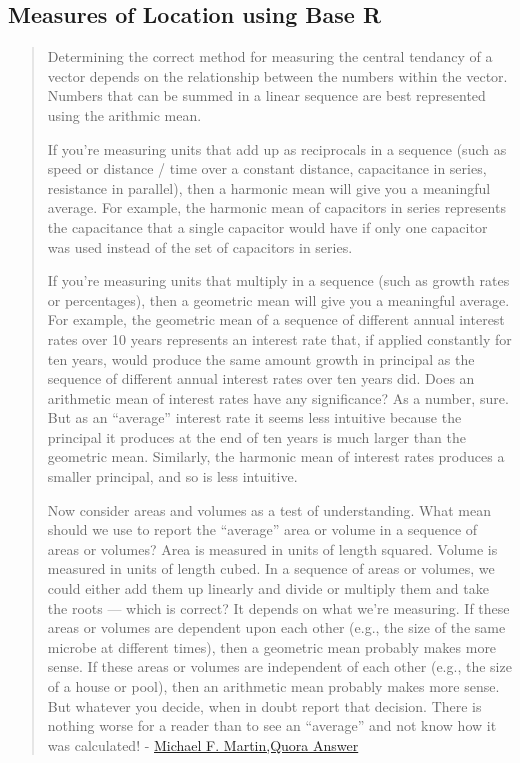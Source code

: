 \documentclass[12pt,]{article}
\theoremstyle{definition}
\theoremstyle{definition}
\theoremstyle{definition}
\theoremstyle{remark}
\begin{document}
\hypertarget{htmlwidget-2f1655e457bef4a9b862}{}

\subsection{Measures of Location using Base
R}\label{measures-of-location-using-base-r}

\begin{quote}
Determining the correct method for measuring the central tendancy of a
vector depends on the relationship between the numbers within the
vector. Numbers that can be summed in a linear sequence are best
represented using the arithmic mean.

If you're measuring units that add up as reciprocals in a sequence (such
as speed or distance / time over a constant distance, capacitance in
series, resistance in parallel), then a harmonic mean will give you a
meaningful average. For example, the harmonic mean of capacitors in
series represents the capacitance that a single capacitor would have if
only one capacitor was used instead of the set of capacitors in series.

If you're measuring units that multiply in a sequence (such as growth
rates or percentages), then a geometric mean will give you a meaningful
average. For example, the geometric mean of a sequence of different
annual interest rates over 10 years represents an interest rate that, if
applied constantly for ten years, would produce the same amount growth
in principal as the sequence of different annual interest rates over ten
years did. Does an arithmetic mean of interest rates have any
significance? As a number, sure. But as an ``average'' interest rate it
seems less intuitive because the principal it produces at the end of ten
years is much larger than the geometric mean. Similarly, the harmonic
mean of interest rates produces a smaller principal, and so is less
intuitive.

Now consider areas and volumes as a test of understanding. What mean
should we use to report the ``average'' area or volume in a sequence of
areas or volumes? Area is measured in units of length squared. Volume is
measured in units of length cubed. In a sequence of areas or volumes, we
could either add them up linearly and divide or multiply them and take
the roots --- which is correct? It depends on what we're measuring. If
these areas or volumes are dependent upon each other (e.g., the size of
the same microbe at different times), then a geometric mean probably
makes more sense. If these areas or volumes are independent of each
other (e.g., the size of a house or pool), then an arithmetic mean
probably makes more sense. But whatever you decide, when in doubt report
that decision. There is nothing worse for a reader than to see an
``average'' and not know how it was calculated! -
\href{https://www.quora.com/When-is-it-most-appropriate-to-take-the-arithmetic-mean-vs-geometric-mean-vs-harmonic-mean}{Michael
F. Martin,Quora Answer}
\end{quote}
\end{document}
